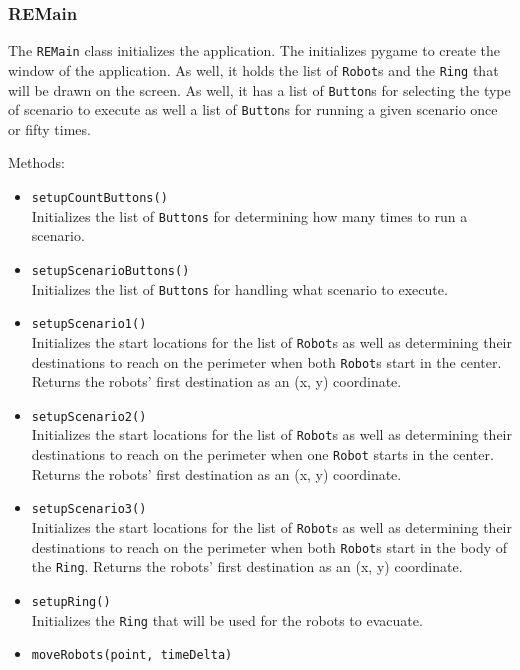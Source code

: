 \documentclass[12pt,letterpaper]{article}
\begin{document}
    \subsubsection{REMain}
        The \texttt{REMain} class initializes the application. The initializes pygame to create the window of the application. As well, it holds the list of \texttt{Robot}s and the \texttt{Ring} that will be drawn on the screen. As well, it has a list of \texttt{Button}s for selecting the type of scenario to execute as well a list of \texttt{Button}s for running a given scenario once or fifty times.

        \noindent Methods:
        \begin{itemize}
            \item \texttt{setupCountButtons()} \\
                Initializes the list of \texttt{Buttons} for determining how many times to run a scenario.
            \item \texttt{setupScenarioButtons()} \\
                Initializes the list of \texttt{Buttons} for handling what scenario to execute.
            \item \texttt{setupScenario1()} \\
                Initializes the start locations for the list of \texttt{Robot}s as well as determining their destinations to reach on the perimeter when both \texttt{Robot}s start in the center. Returns the robots' first destination as an (x, y) coordinate.
            \item \texttt{setupScenario2()} \\
                Initializes the start locations for the list of \texttt{Robot}s as well as determining their destinations to reach on the perimeter when one \texttt{Robot} starts in the center. Returns the robots' first destination as an (x, y) coordinate.
            \item \texttt{setupScenario3()} \\
                Initializes the start locations for the list of \texttt{Robot}s as well as determining their destinations to reach on the perimeter when both \texttt{Robot}s start in the body of the \texttt{Ring}. Returns the robots' first destination as an (x, y) coordinate.
            \item \texttt{setupRing()} \\
                Initializes the \texttt{Ring} that will be used for the robots to evacuate.
            \item \texttt{moveRobots(point, timeDelta)} \\

\end{itemize}
\end{document}
